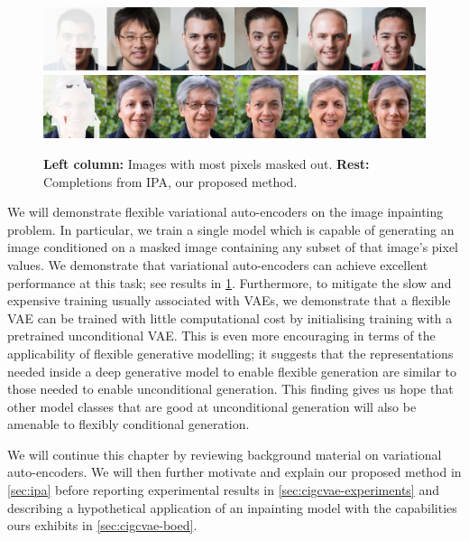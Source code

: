 \begin{figure}[t]
  \centering
  \includegraphics[width=\textwidth]{figs/cigcvae/qual/0_0_patches-4.png}
  \includegraphics[width=\textwidth]{figs/cigcvae/qual/59_2_3_modddd.png}
  \caption{\textbf{Left column:} Images with most pixels masked out.
    \textbf{Rest:} Completions from IPA, our proposed method.
  }
  \label{fig:cigcvae-headline}
\end{figure}

We will demonstrate flexible variational auto-encoders on the image inpainting problem. In particular, we train a single model which is capable of generating an image conditioned on a masked image containing any subset of that image's pixel values. We demonstrate that variational auto-encoders can achieve excellent performance at this task; see results in \cref{fig:cigcvae-headline}. Furthermore, to mitigate the slow and expensive training usually associated with VAEs, we demonstrate that a flexible VAE can be trained with little computational cost by initialising training with a pretrained unconditional VAE. This is even more encouraging in terms of the applicability of flexible generative modelling; it suggests that the representations needed inside a deep generative model to enable flexible generation are similar to those needed to enable unconditional generation. This finding gives us hope that other model classes that are good at unconditional generation will also be amenable to flexibly conditional generation.

We will continue this chapter by reviewing background material on variational auto-encoders. We will then further motivate and explain our proposed method in \cref{sec:ipa} before reporting experimental results in \cref{sec:cigcvae-experiments} and describing a hypothetical application of an inpainting model with the capabilities ours exhibits in \cref{sec:cigcvae-boed}.


